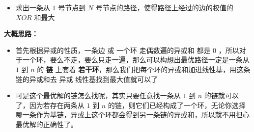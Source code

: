 \documentclass[E:/GsjzTle/main/main.tex]{subfiles}
\begin{document}
\begin{itemize}
\item
  求出一条从 \(1\) 号节点到 \(N\)
  号节点的路径，使得路径上经过的边的权值的 \(XOR\) 和最大
\end{itemize}

\textbf{大概思路：}

\begin{itemize}
\item
  首先根据异或的性质，一条边 或 一个环 走偶数遍的异或和 都是 \(0\)
  ，所以对于一个环，要么不走，要么只走一遍，那么可以构想出最优路径一定是一条从
  \(1\) 到 \(n\) 的 \textbf{链} 上套着
  \textbf{若干环}，那么我们把每个环的异或和加进线性基，用这条链的异或和去
  异或 线性基找到最大值就可以了
\item
  可是这个最优解的链怎么找呢，其实只要任意找一条从 \(1\) 到 \(n\)
  的链就可以了，因为若存在两条从 \(1\) 到 \(n\)
  的链，则它们已经构成了一个环，无论你选择哪一条作为基链，异或上这个环都会得到另一条链的异或和，所以就不用担心最优解的正确性了。
\end{itemize}
\end{document}
